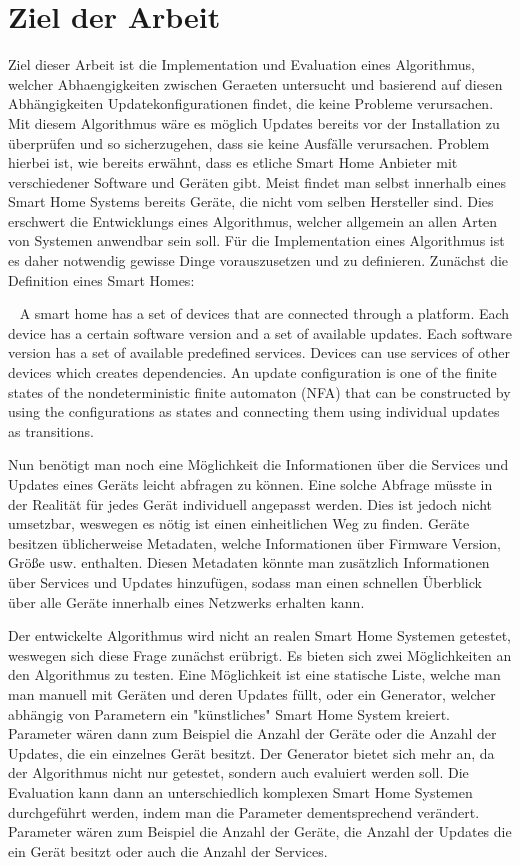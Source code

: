 \section{Ziel der Arbeit}
Ziel dieser Arbeit ist die Implementation und Evaluation eines Algorithmus, welcher Abhaengigkeiten zwischen Geraeten untersucht und basierend auf diesen Abhängigkeiten Updatekonfigurationen findet, die keine Probleme verursachen.
Mit diesem Algorithmus wäre es möglich Updates bereits vor der Installation zu überprüfen und so sicherzugehen, dass sie 
keine Ausfälle verursachen. Problem hierbei ist, wie bereits erwähnt, dass es etliche Smart Home Anbieter mit verschiedener
Software und Geräten gibt. Meist findet man selbst innerhalb eines Smart Home Systems bereits Geräte, die nicht vom selben
Hersteller sind. Dies erschwert die Entwicklungs eines Algorithmus, welcher allgemein an allen Arten von Systemen anwendbar sein soll.
Für die Implementation eines Algorithmus ist es daher notwendig gewisse Dinge vorauszusetzen und zu definieren. Zunächst die Definition eines Smart Homes:

~\cite{Paper [12]}
A smart home has a set of devices that are connected through
a platform. Each device has a certain software version and
a set of available updates. Each software version has a set
of available predefined services. Devices can use services of
other devices which creates dependencies. An update configuration
is one of the finite states of the nondeterministic
finite automaton (NFA) that can be constructed by using the
configurations as states and connecting them using individual
updates as transitions.

Nun benötigt man noch eine Möglichkeit die Informationen über die Services und Updates eines Geräts leicht abfragen zu können.
Eine solche Abfrage müsste in der Realität für jedes Gerät individuell angepasst werden. Dies ist jedoch nicht umsetzbar,
weswegen es nötig ist einen einheitlichen Weg zu finden. Geräte besitzen üblicherweise Metadaten, welche Informationen über 
Firmware Version, Größe usw. enthalten. Diesen Metadaten könnte man zusätzlich Informationen über Services und Updates 
hinzufügen, sodass man einen schnellen Überblick über alle Geräte innerhalb eines Netzwerks erhalten kann.

Der entwickelte Algorithmus wird nicht an realen Smart Home Systemen getestet, weswegen sich diese Frage 
zunächst erübrigt. Es bieten sich zwei Möglichkeiten an den Algorithmus zu testen. Eine Möglichkeit ist eine statische Liste, welche man 
man manuell mit Geräten und deren Updates füllt, oder ein Generator, welcher abhängig von Parametern ein "künstliches" Smart Home
System kreiert. Parameter wären dann zum Beispiel die Anzahl der Geräte oder die Anzahl der Updates, die ein einzelnes Gerät besitzt.
Der Generator bietet sich mehr an, da der Algorithmus nicht nur getestet, sondern auch evaluiert werden soll.
Die Evaluation kann dann an unterschiedlich komplexen Smart Home Systemen durchgeführt werden, indem man die Parameter 
dementsprechend verändert. Parameter wären zum Beispiel die Anzahl der Geräte, die Anzahl der Updates die ein Gerät besitzt oder 
auch die Anzahl der Services. 

 

